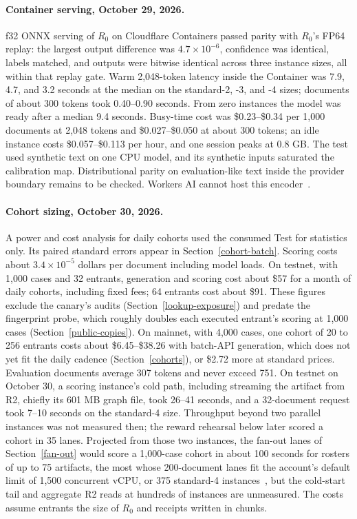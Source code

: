 \paragraph{Container serving, October 29, 2026.}
f32 ONNX serving of \(R_0\) on Cloudflare Containers passed parity
with \(R_0\)'s FP64 replay: the largest output difference was
\(4.7\times10^{-6}\), confidence was identical, labels matched, and outputs were
bitwise identical across three instance sizes, all within that replay
gate. Warm 2,048-token latency inside the Container was 7.9, 4.7, and 3.2
seconds at the median on the standard-2, -3, and -4 sizes; documents of about
300 tokens took 0.40--0.90 seconds. From zero instances the model was ready
after a median 9.4 seconds. Busy-time cost was \$0.23--\$0.34 per 1,000 documents
at 2,048 tokens and \$0.027--\$0.050 at about 300 tokens; an idle instance costs
\$0.057--\$0.113 per hour, and one session peaks at 0.8 GB. The test used
synthetic text on one CPU model, and its synthetic inputs saturated the
calibration map. Distributional parity on evaluation-like text inside the
provider boundary remains to be checked. Workers AI cannot host this
encoder~\cite{containerserving}.

\paragraph{Cohort sizing, October 30, 2026.}
A power and cost analysis for daily cohorts used the consumed Test for
statistics only. Its paired standard errors appear in
Section~\ref{cohort-batch}. Scoring costs about \(3.4\times10^{-5}\) dollars per
document including model loads. On testnet, with 1,000 cases and 32 entrants,
generation and scoring cost about \$57 for a month of daily cohorts, including
fixed fees; 64 entrants cost about \$91. These figures exclude the canary's
audits (Section~\ref{lookup-exposure}) and predate the fingerprint
probe, which roughly doubles each executed entrant's scoring at 1,000 cases
(Section~\ref{public-copies}). On mainnet, with 4,000 cases, one cohort of 20 to
256 entrants costs about \$6.45--\$38.26 with batch-API generation, which does
not yet fit the daily cadence (Section~\ref{cohorts}), or \$2.72 more at
standard prices. Evaluation documents average 307 tokens and never exceed 751.
On testnet on October 30, a scoring instance's cold path, including streaming
the artifact from R2, chiefly its 601 MB graph file, took 26--41 seconds, and a 32-document request took
7--10 seconds on the standard-4 size. Throughput beyond two parallel instances
was not measured then; the reward rehearsal below later scored a cohort in 35
lanes. Projected from those two instances, the fan-out lanes of
Section~\ref{fan-out} would score a 1,000-case cohort in about 100 seconds for
rosters of up to 75 artifacts, the most whose 200-document lanes fit the
account's default limit of 1,500 concurrent vCPU, or 375 standard-4
instances~\cite{cfcontainerlimits}, but the cold-start tail and aggregate R2 reads
at hundreds of instances are unmeasured. The costs assume entrants the size of
\(R_0\) and receipts written in chunks.

